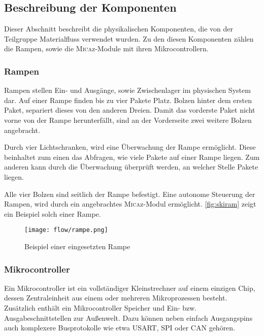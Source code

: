 \subsection{Beschreibung der Komponenten}
Dieser Abschnitt beschreibt die physikalischen Komponenten, die von der Teilgruppe Materialfluss verwendet wurden. Zu den diesen Komponenten zählen die Rampen, sowie die \textsc{Mica}z-Module mit ihren Mikrocontrollern. 
\subsubsection{Rampen}
Rampen stellen Ein- und Ausgänge, sowie Zwischenlager im physischen System dar. Auf einer Rampe finden bis zu vier Pakete Platz. Bolzen hinter dem ersten Paket, separiert dieses von den anderen Dreien. Damit das vorderste Paket nicht vorne von der Rampe herunterfällt, sind an der Vorderseite zwei weitere Bolzen angebracht. 

Durch vier Lichtschranken, wird eine Überwachung der Rampe ermöglicht. Diese beinhaltet zum einen das Abfragen, wie viele Pakete auf einer Rampe liegen. Zum anderen kann durch die Überwachung überprüft werden, an welcher Stelle Pakete liegen.

Alle vier Bolzen sind seitlich der Rampe befestigt. Eine autonome Steuerung der Rampen, wird durch ein angebrachtes \textsc{Mica}z-Modul ermöglicht.
\autoref{fig:skiram} zeigt ein Beispiel solch einer Rampe.

\begin{figure}[h!]
	\centering
		\texttt{[image: flow/rampe.png]}
	\caption{Beispiel einer eingesetzten Rampe}
	\label{fig:skiram}
\end{figure}

\subsubsection{Mikrocontroller}
Ein Mikrocontroller ist ein vollständiger Kleinstrechner auf einem einzigen Chip, dessen Zentraleinheit aus einem oder mehreren Mikroprozessen besteht. Zusätzlich enthält ein Mikrocontroller Speicher und Ein- bzw. Ausgabeschnittstellen zur Außenwelt. Dazu können neben einfach Ausgangspins auch komplexere Busprotokolle wie etwa USART, SPI oder CAN gehören.

